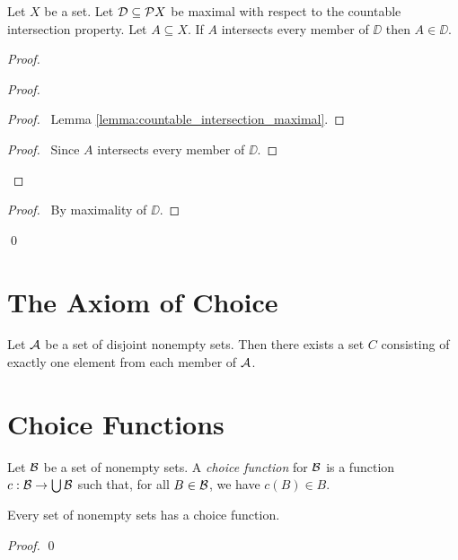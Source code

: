 \begin{lemma}
    Let $X$ be a set. Let $\DD \subseteq \pow X$ be maximal with respect to the countable intersection property.
    Let $A \subseteq X$. If $A$ intersects every member of $\DD$ then $A \in \DD$.
\end{lemma}

\begin{proof}
    \pf
    \begin{proof}
        \begin{proof}
            \pf\ Lemma \ref{lemma:countable_intersection_maximal}.
        \end{proof}
        \begin{proof}
            \pf\ Since $A$ intersects every member of $\DD$.
        \end{proof}
    \end{proof}
    \qedstep
    \begin{proof}
        \pf\ By maximality of $\DD$.
    \end{proof}
    \qed
\end{proof}

\section{The Axiom of Choice}

\begin{axiom}
    Let $\AA$ be a set of disjoint nonempty sets. Then there exists a set $C$ consisting of exactly one element from each member of $\AA$.
\end{axiom}

\section{Choice Functions}

\begin{definition}
    Let $\BB$ be a set of nonempty sets. A \emph{choice function} for $\BB$ is a function $c : \BB \rightarrow \bigcup \BB$ such that, for all $B \in \BB$,
    we have $c(B) \in B$.
\end{definition}

\begin{lemma}
    \label{lemma:choice_function}
    Every set of nonempty sets has a choice function.
\end{lemma}

\begin{proof}
    \pf
    \qed
\end{proof}